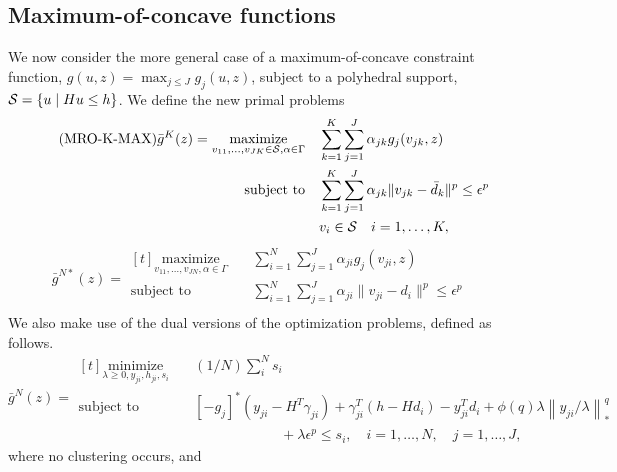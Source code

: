 {{\subsection{Maximum-of-concave functions}
\label{sub:maxofconcavebounds}
We now consider the more general case of a maximum-of-concave constraint function, $g(u,z) = \max_{j\leq J} g_j(u,z)$, subject to a polyhedral support, $\mathcal{S} = \{u \mid Hu\leq h\}$. We define the new primal problems
\begin{equation}
	\tag{MRO-K-MAX}
	\bar{g}^K(z) = \begin{aligned}[t]
	\label{eq:nocluster_one_max}
	\underset{v_{11},\dots,v_{JK} \in \mathcal{S}, \alpha \in \Gamma}{\text{maximize}} &\quad \sum_{k=1} ^K \sum_{j=1}^J \alpha_{jk} g_j(v_{jk}, z) \\
	\mbox{subject to} & \quad \sum_{k=1}^K \sum_{j=1}^J \alpha_{jk} \| v_{jk} - \bar{d}_k \|^p \le \epsilon^p\\
	& \quad v_i\in \mathcal{S} \quad i = 1,\dots,K,
	\end{aligned}
\end{equation}
\begin{equation}
	\tag{MRO-N*-MAX}
	\label{eq:nocluster_inf_max}
	\bar{g}^{N*}(z) = \begin{aligned}[t]
		\underset{v_{11},\dots,v_{JN}, \alpha \in \Gamma}{\text{maximize}} &\quad \sum_{i=1} ^N \sum_{j=1}^J \alpha_{ji} g_j(v_{ji}, z) \\
		\mbox{subject to} & \quad \sum_{i=1}^N \sum_{j=1}^J \alpha_{ji} \| v_{ji} - d_i \|^p \le \epsilon^p\\
		\end{aligned}
\end{equation}
We also make use of the dual versions of the optimization problems, defined as follows. 
\begin{equation}
	\tag{MRO-N-Dual}
	\bar{g}^N(z) =\begin{aligned}[t]
	\label{eq:nocluster_dual}
	\underset{\lambda \geq 0, y_{ji},h_{ji}, s_i}{\text{minimize}} & \quad(1/N)\sum_i^N  s_i\\
	\mbox{subject to} & \quad[-g_j]^*(y_{ji} - H^T\gamma_{ji}) + \gamma_{ji}^T(h-Hd_i) - y_{ji}^Td_i  + \phi(q)\lambda \left\|y_{ji}/\lambda \right\|^q_* \\	
	& \hspace{3cm} + \lambda \epsilon^p \le s_i, \quad i = 1,\dots,N, \quad j = 1,\dots,J,
\end{aligned}
\end{equation}
where no clustering occurs, and 
\begin{equation}

\end{equation}}}
